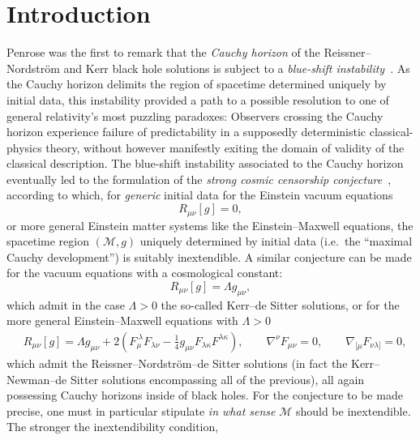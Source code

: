 \documentclass[A4,10pt]{article}
\begin{document}
\section{Introduction}
\label{theintrosec}


Penrose was the first to remark that the
\emph{Cauchy horizon} of the Reissner--Nordstr\"om and Kerr black hole solutions
 is subject to
a \emph{blue-shift instability}~\cite{penrose1968battelle}. 
As the Cauchy  horizon
delimits the region of spacetime
determined uniquely by initial data, this instability provided a path to a possible resolution to one
of general relativity's most puzzling paradoxes:  Observers crossing the Cauchy horizon
experience failure of predictability in a supposedly deterministic classical-physics 
theory, without however
manifestly exiting the domain of validity of the classical description.  The blue-shift instability
associated to the Cauchy horizon  eventually led to the formulation 
of the  \emph{strong cosmic censorship conjecture}~\cite{PenroseSCCrefer}, 
according to which, for \emph{generic} 
initial data for the Einstein vacuum equations
\begin{equation}
\label{Einsteinvac}
R_{\mu\nu}[g]=0,
\end{equation}
or more general Einstein matter systems like the Einstein--Maxwell equations,
the spacetime region $(\mathcal{M},g)$ uniquely determined by initial data (i.e.~the ``maximal Cauchy development'') is
suitably inextendible. 
A similar conjecture can be made for the vacuum equations
with  a  cosmological constant:
\begin{equation}
\label{EinsteinvacLambda}
R_{\mu\nu}[g]=\Lambda g_{\mu\nu},
\end{equation}
 which admit in the case $\Lambda>0$
the so-called  Kerr--de Sitter solutions, or
for the more general Einstein--Maxwell equations with $\Lambda>0$
\begin{align}
 	\label{eq:einsteinmaxwell}
	&R_{\mu\nu}[g] = \Lambda g_{\mu\nu}+ 2 \left( F_{\mu}^{~\lambda} F_{\lambda\nu}  - \frac{1}{4} g_{\mu\nu} F_{\lambda \kappa} F^{\lambda \kappa} \right), \qquad 
\nabla^\nu F_{\mu\nu} = 0 , \qquad \nabla_{[\mu} F_{\nu\lambda]} = 0,
\end{align}
which admit the 
Reissner--Nordstr\"om--de Sitter solutions
(in fact the Kerr--Newman--de Sitter solutions encompassing
all of the previous),
all again possessing Cauchy horizons inside of black holes.
 For the conjecture  to be made precise, one must in particular stipulate 
\emph{in what sense} $\mathcal{M}$ should be inextendible. The stronger the inextendibility condition,
\end{document}
